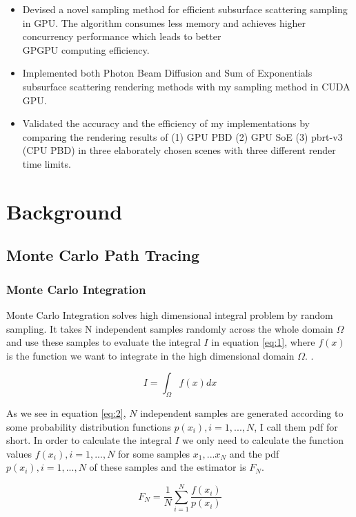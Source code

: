 \documentclass[letterpaper,12pt]{article}
\begin{document}
\begin{itemize}
    \item Devised a novel sampling method for efficient subsurface scattering sampling in GPU. The algorithm consumes less memory and achieves higher concurrency performance which leads to better \\
    GPGPU computing efficiency.
    \item Implemented both Photon Beam Diffusion and Sum of Exponentials subsurface scattering rendering methods with my sampling method in CUDA GPU.
    \item Validated the accuracy and the efficiency of my implementations by comparing the rendering results of (1) GPU PBD (2) GPU SoE (3) pbrt-v3 (CPU PBD) in three elaborately chosen scenes with three different render time limits.
\end{itemize}

\section{Background}
\subsection{Monte Carlo Path Tracing}

\subsubsection{Monte Carlo Integration}
Monte Carlo Integration solves high dimensional integral problem by random sampling. It takes N independent samples randomly across the whole domain $\Omega$ and use these samples to evaluate the integral $I$ in equation \ref{eq:1}, where $f(x)$ is the function we want to integrate in the high dimensional domain $\Omega$. \cite{kajiya1986rendering}.  

\begin{equation} \label{eq:1}
    I = \int_\Omega f(x)dx
\end{equation}

As we see in equation \ref{eq:2}, $N$ independent samples are generated according to some probability distribution functions $p(x_i),i=1,...,N$, I call them pdf for short. In order to calculate the integral $I$ we only need to calculate the function values $f(x_i),i=1,...,N$ for some samples $x_1,...x_N$ and the pdf $p(x_i),i=1,...,N$ of these samples and the estimator is $F_N$.

\begin{equation} \label{eq:2}
    F_N = \frac{1}{N}\sum_{i=1}^N\frac{f(x_i)}{p(x_i)}
\end{equation}
\end{document}
